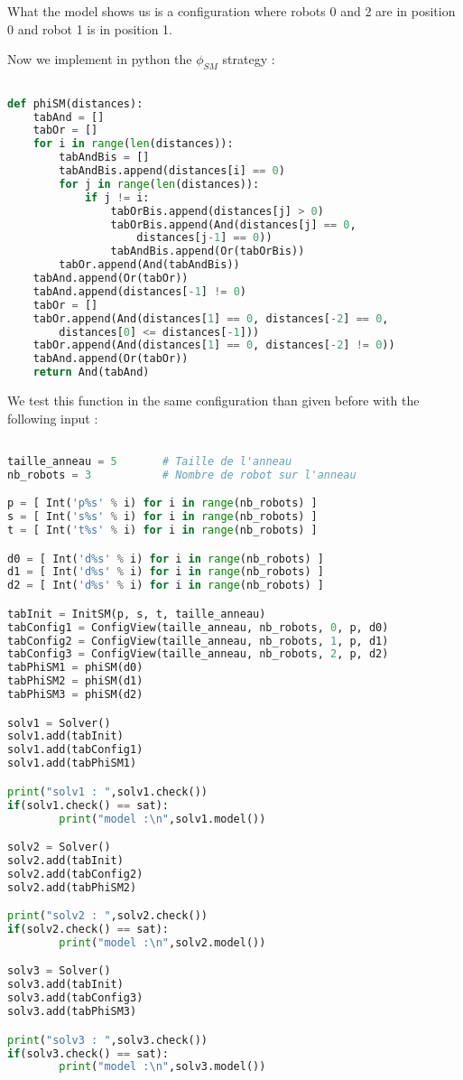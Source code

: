 \documentclass{article}
\begin{document}
What the model shows us is a configuration where robots 0 and 2 are in position 0 and robot 1 is in position 1.

Now we implement in python the $\phi_{SM}$ strategy :

\begin{lstlisting}[language=Python]

def phiSM(distances):
    tabAnd = []
    tabOr = []
    for i in range(len(distances)):
        tabAndBis = []
        tabAndBis.append(distances[i] == 0)
        for j in range(len(distances)):
            if j != i:
                tabOrBis.append(distances[j] > 0)
                tabOrBis.append(And(distances[j] == 0,
                    distances[j-1] == 0))
                tabAndBis.append(Or(tabOrBis))
        tabOr.append(And(tabAndBis))
    tabAnd.append(Or(tabOr))
    tabAnd.append(distances[-1] != 0)
    tabOr = []
    tabOr.append(And(distances[1] == 0, distances[-2] == 0,
        distances[0] <= distances[-1]))
    tabOr.append(And(distances[1] == 0, distances[-2] != 0))
    tabAnd.append(Or(tabOr))
    return And(tabAnd)
\end{lstlisting}

We test this function in the same configuration than given before with the following input :

\begin{lstlisting}[language=Python]

taille_anneau = 5       # Taille de l'anneau 
nb_robots = 3           # Nombre de robot sur l'anneau

p = [ Int('p%s' % i) for i in range(nb_robots) ]
s = [ Int('s%s' % i) for i in range(nb_robots) ]
t = [ Int('t%s' % i) for i in range(nb_robots) ]

d0 = [ Int('d%s' % i) for i in range(nb_robots) ]
d1 = [ Int('d%s' % i) for i in range(nb_robots) ]
d2 = [ Int('d%s' % i) for i in range(nb_robots) ]

tabInit = InitSM(p, s, t, taille_anneau)
tabConfig1 = ConfigView(taille_anneau, nb_robots, 0, p, d0)
tabConfig2 = ConfigView(taille_anneau, nb_robots, 1, p, d1)
tabConfig3 = ConfigView(taille_anneau, nb_robots, 2, p, d2)
tabPhiSM1 = phiSM(d0)
tabPhiSM2 = phiSM(d1)
tabPhiSM3 = phiSM(d2)

solv1 = Solver()
solv1.add(tabInit)
solv1.add(tabConfig1)
solv1.add(tabPhiSM1)

print("solv1 : ",solv1.check())
if(solv1.check() == sat):
        print("model :\n",solv1.model())

solv2 = Solver()
solv2.add(tabInit)
solv2.add(tabConfig2)
solv2.add(tabPhiSM2)

print("solv2 : ",solv2.check())
if(solv2.check() == sat):
        print("model :\n",solv2.model())

solv3 = Solver()
solv3.add(tabInit)
solv3.add(tabConfig3)
solv3.add(tabPhiSM3)

print("solv3 : ",solv3.check())
if(solv3.check() == sat):
        print("model :\n",solv3.model())
\end{lstlisting}
\end{document}
